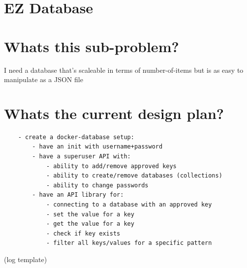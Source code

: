 \documentclass{article}
\newcommand{\br}{ \hfill \break}
\begin{document}
%
%
%
\date{January 2020} \br \begin{adjustwidth}{2.5em}{0pt}

\section{EZ Database}
\section{Whats this sub-problem?}

I need a database that's scaleable in terms of number-of-items but is as easy to manipulate as a JSON file


\section{Whats the current design plan?}
\begin{verbatim}
    - create a docker-database setup:
        - have an init with username+password
        - have a superuser API with:
            - ability to add/remove approved keys
            - ability to create/remove databases (collections)
            - ability to change passwords
        - have an API library for:
            - connecting to a database with an approved key
            - set the value for a key
            - get the value for a key
            - check if key exists
            - filter all keys/values for a specific pattern
\end{verbatim}
\end{adjustwidth} \br 




%
%
%
\date{January 1 2020} \br \begin{adjustwidth}{2.5em}{0pt}
(log template)
\end{adjustwidth} \br


% 
% 
\end{document}
